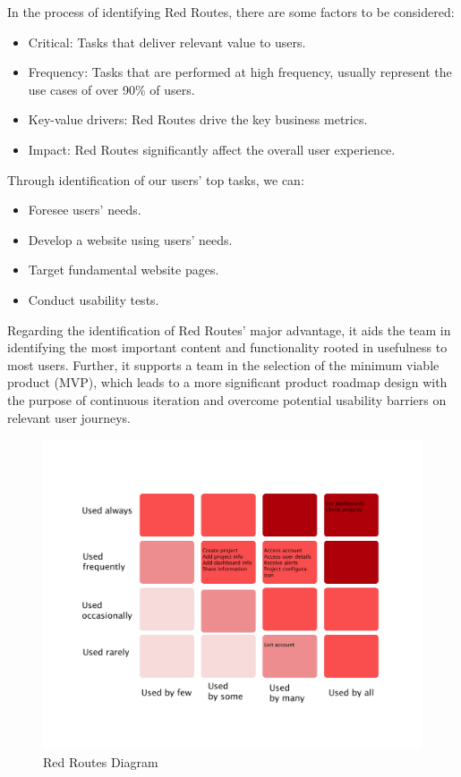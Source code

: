 \documentclass[a4paper,twoside,10pt]{report}
\begin{document}
In the process of identifying Red Routes, there are some factors to be considered:
\begin{itemize}
	\item Critical: Tasks that deliver relevant value to users.
 	\item Frequency: Tasks that are performed at high frequency, usually represent the use cases of over 90\% of users.
 	\item Key-value drivers: Red Routes drive the key business metrics.
 	\item Impact: Red Routes significantly affect the overall user experience.
\end{itemize}
Through identification of our users' top tasks, we can:
\begin{itemize}
	\item Foresee users' needs.
	\item Develop a website using users' needs.
	\item Target fundamental website pages.
	\item Conduct usability tests.
\end{itemize}	
Regarding the identification of Red Routes' major advantage, it aids the team in identifying the most important content and functionality rooted in usefulness to most users. Further, it supports a team in the selection of the minimum viable product (MVP), which leads to a more significant product roadmap design with the purpose of continuous iteration and overcome potential usability barriers on relevant user journeys. 
\begin{figure}[h!]
\center
  \includegraphics[width=\textwidth]{red-routes.png}
\caption{Red Routes Diagram}
\end{figure}
\end{document}
